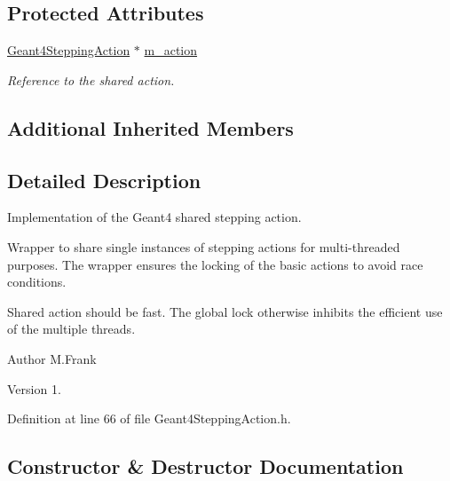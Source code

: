 \subsection*{Protected Attributes}
\begin{DoxyCompactItemize}
\item 
\hyperlink{class_d_d4hep_1_1_simulation_1_1_geant4_stepping_action}{Geant4\+Stepping\+Action} $\ast$ \hyperlink{class_d_d4hep_1_1_simulation_1_1_geant4_shared_stepping_action_a193a6e462877931a4423e15174aa5a7b}{m\+\_\+action}
\begin{DoxyCompactList}\small\item\em Reference to the shared action. \end{DoxyCompactList}\end{DoxyCompactItemize}
\subsection*{Additional Inherited Members}


\subsection{Detailed Description}
Implementation of the Geant4 shared stepping action. 

Wrapper to share single instances of stepping actions for multi-\/threaded purposes. The wrapper ensures the locking of the basic actions to avoid race conditions.

Shared action should be \textquotesingle{}fast\textquotesingle{}. The global lock otherwise inhibits the efficient use of the multiple threads.

\begin{DoxyAuthor}{Author}
M.\+Frank 
\end{DoxyAuthor}
\begin{DoxyVersion}{Version}
1. 
\end{DoxyVersion}


Definition at line 66 of file Geant4\+Stepping\+Action.\+h.



\subsection{Constructor \& Destructor Documentation}
\hypertarget{class_d_d4hep_1_1_simulation_1_1_geant4_shared_stepping_action_a097ab882bbad9d3a4c4dae2e7f764631}{}\label{class_d_d4hep_1_1_simulation_1_1_geant4_shared_stepping_action_a097ab882bbad9d3a4c4dae2e7f764631} 

